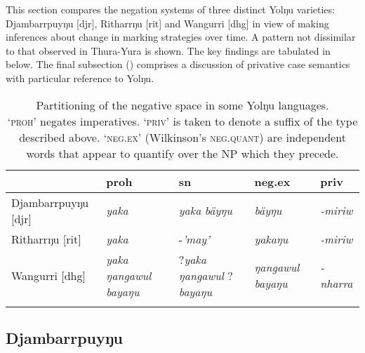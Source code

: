\documentclass[output=paper,draft,draftmode,colorlinks,citecolor=brown]{langscibook}
\begin{document}
This section compares the negation systems of three distinct Yolŋu
varieties: Djambarrpuyŋu [djr], Ritharrŋu
[rit] and Wangurri [dhg] in view of making inferences about
change in marking strategies over time. A pattern not dissimilar to that
observed in Thura-Yura is shown. The key findings are tabulated in 
 below. The final subsection () comprises a discussion of privative case semantics with particular reference to Yolŋu.

\begin{table}
	\centering
	\caption{Partitioning of the negative space in some Yolŋu languages.\\`\textsc{proh}' negates imperatives. `\textsc{priv}' is taken to denote a suffix of the type described above. `\textsc{neg.ex}' (Wilkinson's \textsc{neg.quant}) are independent words that appear to quantify over the NP which they precede.}
	\label{tab:austr-neg-comparison-yolngu}
	\begin{tabularx}{\textwidth}{lQQQQ}
\lsptoprule
    & {\sc proh} & {\sc sn} & {\sc neg.ex} & {\sc priv} \\
    \midrule
    Djambarrpuyŋu [djr] & \textit{yaka} & \textit{yaka}\newline
                                          \textit{bäyŋu}    & \textit{bäyŋu} & \textit{-miriw} \\
    \tablevspace
    Ritharrŋu [rit] & \textit{yaka} & -\textit{'may'} & \textit{yakaŋu} & \textit{-miriw} \\
    \tablevspace
    Wangurri [dhg] &   \textit{yaka}\newline
                       \textit{ŋangawul}\newline
                       \textit{bayaŋu}    & ?\textit{yaka}\newline
                                            \textit{ŋangawul}\newline
                                            ?\textit{bayaŋu} &   \textit{ŋangawul}\newline
                                                                    \textit{bayaŋu}    & \textit{-nharra} \\
    \lspbottomrule
	\end{tabularx}
\end{table}

\subsection{Djambarrpuyŋu}\label{sec:austr-4.1}
\end{document}

